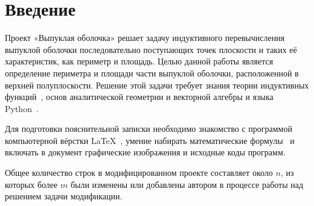 \section{Введение}

Проект «Выпуклая оболочка»\cite{convex} решает задачу индуктивного 
перевычисления 
выпуклой оболочки последовательно поступающих точек плоскости и таких её
характеристик, как периметр и площадь. Целью данной работы является
определение периметра и площади части выпуклой оболочки, расположенной
в верхней полуплоскости. Решение этой задачи требует знания теории индуктивных
функций~\cite{ind-functions}, основ аналитической геометрии и векторной алгебры
и языка Python~\cite{python}.

Для подготовки пояснительной записки необходимо знакомство с программой
компьютерной вёрстки \LaTeX~\cite{rlatex}, умение набирать математические 
формулы~\cite{texbook} и включать в документ графические изображения и исходные
коды программ.

Общее количество строк в модифицированном проекте составляет около $n$,
из которых более $m$ были изменены или добавлены автором в процессе работы
над решением задачи модификации.

